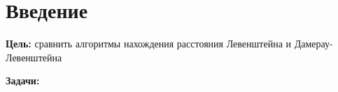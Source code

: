 

\chapter{Введение}

\textbf{Цель:} сравнить алгоритмы нахождения расстояния Левенштейна и Дамерау-Левенштейна

\textbf{Задачи:}

